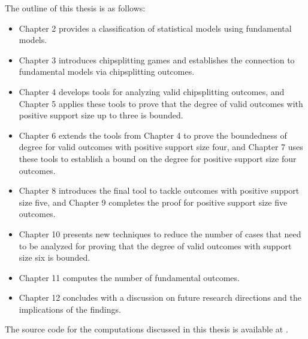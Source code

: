 The outline of this thesis is as follows: 
\begin{itemize}
    \item Chapter 2 provides a classification of statistical models using fundamental models.
    \item Chapter 3 introduces chipsplitting games and establishes the connection to fundamental models via chipsplitting outcomes.
    \item Chapter 4 develops tools for analyzing valid chipsplitting outcomes, and Chapter 5 applies these tools to prove that the degree of valid outcomes with positive support size up to three is bounded.
    \item Chapter 6 extends the tools from Chapter 4 to prove the boundedness of degree for valid outcomes with positive support size four, and Chapter 7 uses these tools to establish a bound on the degree for positive support size four outcomes.
    \item Chapter 8 introduces the final tool to tackle outcomes with positive support size five, and Chapter 9 completes the proof for positive support size five outcomes.
    \item Chapter 10 presents new techniques to reduce the number of cases that need to be analyzed for proving that the degree of valid outcomes with support size six is bounded.
    \item Chapter 11 computes the number of fundamental outcomes.
    \item Chapter 12 concludes with a discussion on future research directions and the implications of the findings.
\end{itemize}


The source code for the computations discussed in this thesis is available at \cite{ducrepo}.
